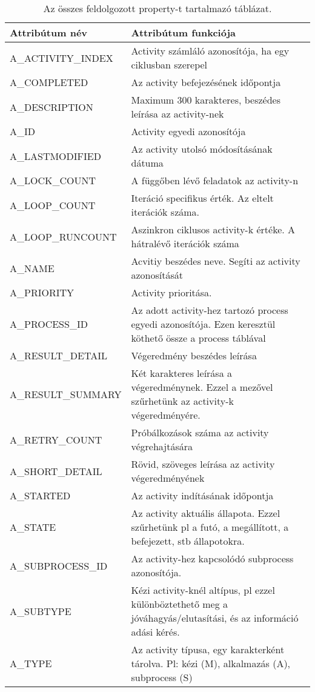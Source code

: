 	\begin{longtable}{lp{10cm}}
		\caption{Az összes feldolgozott property-t tartalmazó táblázat.} \cr
		Attribútum név & Attribútum funkciója \\
		\toprule
		A\_ACTIVITY\_INDEX & Activity számláló azonosítója, ha egy ciklusban szerepel \\
		A\_COMPLETED & Az activity befejezésének időpontja \\
		A\_DESCRIPTION & Maximum 300 karakteres, beszédes leírása az activity-nek \\
		A\_ID & Activity egyedi azonosítója \\
		A\_LASTMODIFIED & Az activity utolsó módosításának dátuma \\
		A\_LOCK\_COUNT & A függőben lévő feladatok az activity-n \\
		A\_LOOP\_COUNT & Iteráció specifikus érték. Az eltelt iterációk száma. \\
		A\_LOOP\_RUNCOUNT & Aszinkron ciklusos activity-k értéke. A hátralévő iterációk száma \\
		A\_NAME & Acvitiy beszédes neve. Segíti az activity azonosítását \\
		A\_PRIORITY & Activity prioritása. \\
		A\_PROCESS\_ID & Az adott activity-hez tartozó process egyedi azonosítója. Ezen keresztül köthető össze a process táblával \\
		A\_RESULT\_DETAIL & Végeredmény beszédes leírása \\
		A\_RESULT\_SUMMARY & Két karakteres leírása a végeredménynek. Ezzel a mezővel szűrhetünk az activity-k végeredményére. \\
		A\_RETRY\_COUNT & Próbálkozások száma az activity végrehajtására \\
		A\_SHORT\_DETAIL & Rövid, szöveges leírása az activity végeredményének \\
		A\_STARTED & Az activity indításának időpontja \\
		A\_STATE & Az activity aktuális állapota. Ezzel szűrhetünk pl a futó, a megállított, a befejezett, stb állapotokra. \\
		A\_SUBPROCESS\_ID & Az activity-hez kapcsolódó subprocess azonosítója. \\
		A\_SUBTYPE & Kézi activity-knél altípus, pl ezzel különböztethető meg a jóváhagyás/elutasítási, és az információ adási kérés. \\
		A\_TYPE & Az activity típusa, egy karakterként tárolva. Pl: kézi (M), alkalmazás (A), subprocess (S) \\

\end{longtable}
